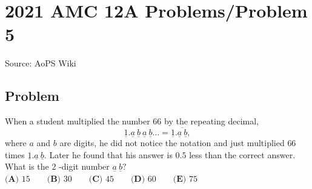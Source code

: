 \documentclass[12pt]{article}
\begin{document}
\section*{{2021 AMC 12A Problems/Problem 5}}
Source: AoPS Wiki

\subsection*{Problem}
When a student multiplied the number $66$ by the repeating decimal, \[\underline{1}.\underline{a} \ \underline{b} \ \underline{a} \ \underline{b}\ldots=\underline{1}.\overline{\underline{a} \ \underline{b}},\] where $a$ and $b$ are digits, he did not notice the notation and just multiplied $66$ times $\underline{1}.\underline{a} \ \underline{b}.$ Later he found that his answer is $0.5$ less than the correct answer. What is the $2$ -digit number $\underline{a} \ \underline{b}?$ $\textbf{(A) }15 \qquad \textbf{(B) }30 \qquad \textbf{(C) }45 \qquad \textbf{(D) }60 \qquad \textbf{(E) }75$
\end{document}

